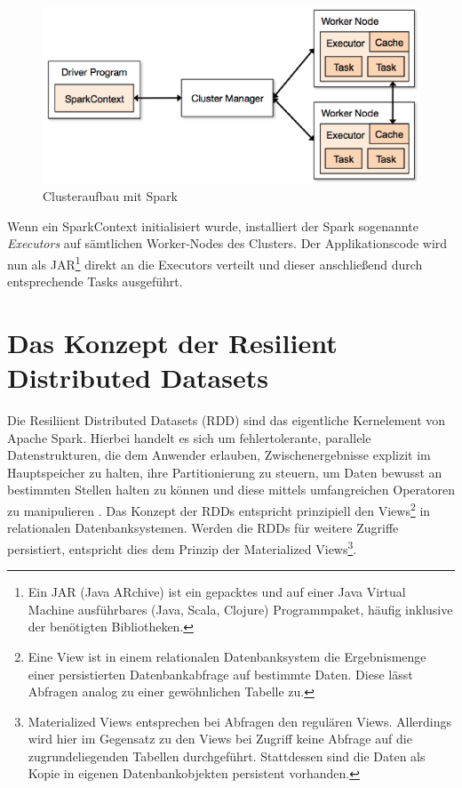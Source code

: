 

\begin{figure}[htb!]
\centering
\includegraphics[width=1.0\textwidth]{bilder/3_2_cluster.png}
\caption{Clusteraufbau mit Spark \protect{}}
\label{fig:sparkcluster}
\end{figure} 





Wenn ein SparkContext initialisiert wurde, installiert der Spark sogenannte \textit{Executors} auf sämtlichen Worker-Nodes des Clusters. Der Applikationscode wird nun als JAR\footnote{Ein JAR (Java ARchive) ist ein gepacktes und auf einer Java Virtual Machine ausführbares (Java, Scala, Clojure) Programmpaket, häufig inklusive der benötigten Bibliotheken.} direkt an die Executors verteilt und dieser anschließend durch entsprechende Tasks ausgeführt. 



  
\section{Das Konzept der Resilient Distributed Datasets}
\label{section:rdd}

Die Resiliient Distributed Datasets (RDD) sind das eigentliche Kernelement von Apache Spark. Hierbei handelt es sich um fehlertolerante, parallele Datenstrukturen, die dem Anwender erlauben, Zwischenergebnisse explizit im Hauptspeicher zu halten, ihre Partitionierung zu steuern, um Daten bewusst an bestimmten Stellen halten zu können und diese mittels umfangreichen Operatoren zu manipulieren  . Das Konzept der RDDs entspricht prinzipiell den Views\footnote{Eine View ist in einem relationalen Datenbanksystem die Ergebnismenge einer persistierten Datenbankabfrage auf bestimmte Daten. Diese lässt Abfragen analog zu einer gewöhnlichen Tabelle zu.} in relationalen Datenbanksystemen. Werden die RDDs für weitere Zugriffe persistiert, entspricht dies dem Prinzip der Materialized Views\footnote{Materialized Views entsprechen bei Abfragen den regulären Views. Allerdings wird hier im Gegensatz zu den Views bei Zugriff keine Abfrage auf die zugrundeliegenden Tabellen durchgeführt. Stattdessen sind die Daten als Kopie in eigenen Datenbankobjekten persistent vorhanden.}.  

